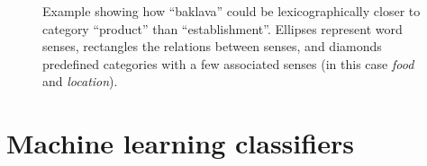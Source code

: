 \documentclass[a4paper,11pt]{kth-mag}
\begin{document}
\begin{figure}[t]
  \centering
  \caption{Example showing how ``baklava'' could be lexicographically closer to category ``product'' than ``establishment''. Ellipses represent word senses, rectangles the relations between senses, and diamonds predefined categories with a few associated senses (in this case \emph{food} and \emph{location}).}
  \label{fig:baklava_lex}
\end{figure}






\section{Machine learning classifiers}
\end{document}
